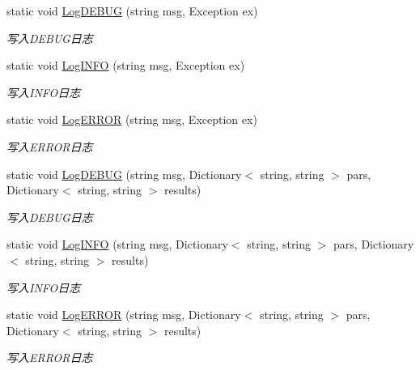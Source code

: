 \begin{DoxyCompactItemize}
static void \hyperlink{class_krs_1_1_base_1_1_logs_1_1_log_message_helper_a16cb3e63f48ad5e9ed2a6bc523439383}{Log\-D\-E\-B\-U\-G} (string msg, Exception ex)
\begin{DoxyCompactList}\small\item\em 写入\-D\-E\-B\-U\-G日志 \end{DoxyCompactList}\item 
static void \hyperlink{class_krs_1_1_base_1_1_logs_1_1_log_message_helper_aa2b82218ce5727b09bef28a5d2a38a36}{Log\-I\-N\-F\-O} (string msg, Exception ex)
\begin{DoxyCompactList}\small\item\em 写入\-I\-N\-F\-O日志 \end{DoxyCompactList}\item 
static void \hyperlink{class_krs_1_1_base_1_1_logs_1_1_log_message_helper_ab4e1ef6082f482e420289345d371c2f0}{Log\-E\-R\-R\-O\-R} (string msg, Exception ex)
\begin{DoxyCompactList}\small\item\em 写入\-E\-R\-R\-O\-R日志 \end{DoxyCompactList}\item 
static void \hyperlink{class_krs_1_1_base_1_1_logs_1_1_log_message_helper_a142af08f04810239e0ecbb58fa4860df}{Log\-D\-E\-B\-U\-G} (string msg, Dictionary$<$ string, string $>$ pars, Dictionary$<$ string, string $>$ results)
\begin{DoxyCompactList}\small\item\em 写入\-D\-E\-B\-U\-G日志 \end{DoxyCompactList}\item 
static void \hyperlink{class_krs_1_1_base_1_1_logs_1_1_log_message_helper_a38f1dc7fbff4458852982bbeb2578d7a}{Log\-I\-N\-F\-O} (string msg, Dictionary$<$ string, string $>$ pars, Dictionary$<$ string, string $>$ results)
\begin{DoxyCompactList}\small\item\em 写入\-I\-N\-F\-O日志 \end{DoxyCompactList}\item 
static void \hyperlink{class_krs_1_1_base_1_1_logs_1_1_log_message_helper_ae29b0fc865b54c4faa7c4c3de941a2ce}{Log\-E\-R\-R\-O\-R} (string msg, Dictionary$<$ string, string $>$ pars, Dictionary$<$ string, string $>$ results)
\begin{DoxyCompactList}\small\item\em 写入\-E\-R\-R\-O\-R日志 \end{DoxyCompactList}\item 

\end{DoxyCompactItemize}
